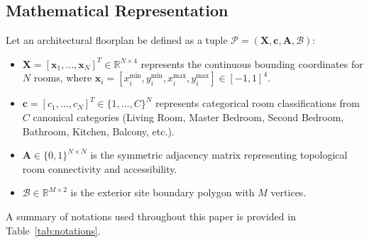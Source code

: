 \documentclass[journal]{IEEEtran}
\begin{document}
\subsection{Mathematical Representation}
Let an architectural floorplan be defined as a tuple $\mathcal{P} = (\mathbf{X}, \mathbf{c}, \mathbf{A}, \mathcal{B})$:
\begin{itemize}
    \item $\mathbf{X} = [\mathbf{x}_1, \dots, \mathbf{x}_N]^T \in \mathbb{R}^{N \times 4}$ represents the continuous bounding coordinates for $N$ rooms, where $\mathbf{x}_i = [x_{i}^{\min}, y_{i}^{\min}, x_{i}^{\max}, y_{i}^{\max}] \in [-1, 1]^4$.
    \item $\mathbf{c} = [c_1, \dots, c_N]^T \in \{1, \dots, C\}^N$ represents categorical room classifications from $C$ canonical categories (Living Room, Master Bedroom, Second Bedroom, Bathroom, Kitchen, Balcony, etc.).
    \item $\mathbf{A} \in \{0, 1\}^{N \times N}$ is the symmetric adjacency matrix representing topological room connectivity and accessibility.
    \item $\mathcal{B} \in \mathbb{R}^{M \times 2}$ is the exterior site boundary polygon with $M$ vertices.
\end{itemize}

A summary of notations used throughout this paper is provided in Table~\ref{tab:notations}.
\end{document}
